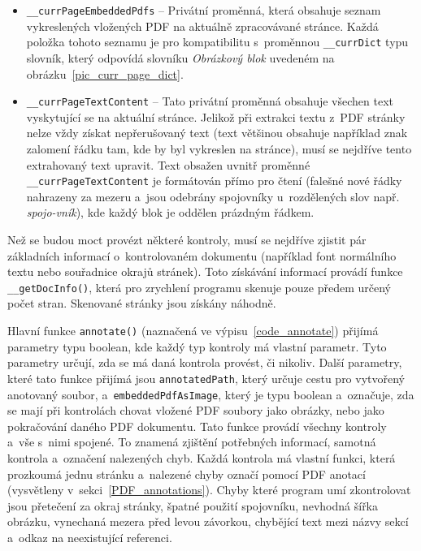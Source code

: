 \begin{itemize}
    \item \texttt{\_\_currPageEmbeddedPdfs} -- Privátní proměnná, která obsahuje
    seznam vykreslených vložených PDF na aktuálně zpracovávané stránce. Každá
    položka tohoto seznamu je pro kompatibilitu s~proměnnou \texttt{\_\_currDict}
    typu slovník, který odpovídá slovníku \emph{Obrázkový blok} uvedeném na
    obrázku~\ref{pic_curr_page_dict}. 
    
    \item \texttt{\_\_currPageTextContent} -- Tato privátní proměnná obsahuje
    všechen text vyskytující se na aktuální stránce. Jelikož při extrakci textu
    z~PDF stránky nelze vždy získat nepřerušovaný text (text většinou obsahuje
    například znak
    zalomení řádku tam, kde by byl vykreslen na stránce), musí se nejdříve tento
    extrahovaný text upravit.
    Text obsažen uvnitř proměnné \texttt{\_\_currPageTextContent} je formátován
    přímo pro čtení (falešné nové řádky nahrazeny za mezeru a~jsou odebrány
    spojovníky u~rozdělených slov např. \emph{spojo-vník}), kde každý blok je
    oddělen prázdným
    řádkem.
\end{itemize}

Než se budou moct provézt některé kontroly, musí se nejdříve zjistit pár
základních informací o~kontrolovaném dokumentu (například font normálního textu
nebo souřadnice okrajů stránek). Toto získávání informací provádí funkce
\texttt{\_\_getDocInfo()}, která pro zrychlení programu skenuje pouze předem
určený počet stran. Skenované stránky jsou získány náhodně.

% 

Hlavní funkce \texttt{annotate()} (naznačená ve výpisu~\ref{code_annotate}) přijímá parametry typu boolean, kde
každý typ kontroly má vlastní parametr. Tyto parametry určují, zda se má daná
kontrola provést, či nikoliv. Další parametry, které tato funkce přijímá jsou
\texttt{annotatedPath}, který určuje cestu pro vytvořený anotovaný soubor,
a~\texttt{embeddedPdfAsImage}, který je typu boolean a~označuje, zda se mají
při kontrolách chovat vložené PDF soubory jako obrázky, nebo jako pokračování
daného PDF dokumentu. Tato funkce provádí všechny kontroly a~vše s~nimi spojené.
To znamená zjištění potřebných informací, samotná kontrola a~označení nalezených
chyb. Každá kontrola má vlastní funkci, která prozkoumá jednu stránku a~nalezené
chyby označí pomocí PDF anotací (vysvětleny v~sekci~\ref{PDF_annotations}).
Chyby které program umí zkontrolovat jsou přetečení za okraj stránky, 
špatné použití spojovníku, nevhodná šířka obrázku, vynechaná mezera před levou
závorkou, chybějící text mezi názvy sekcí a~odkaz na neexistující referenci.

